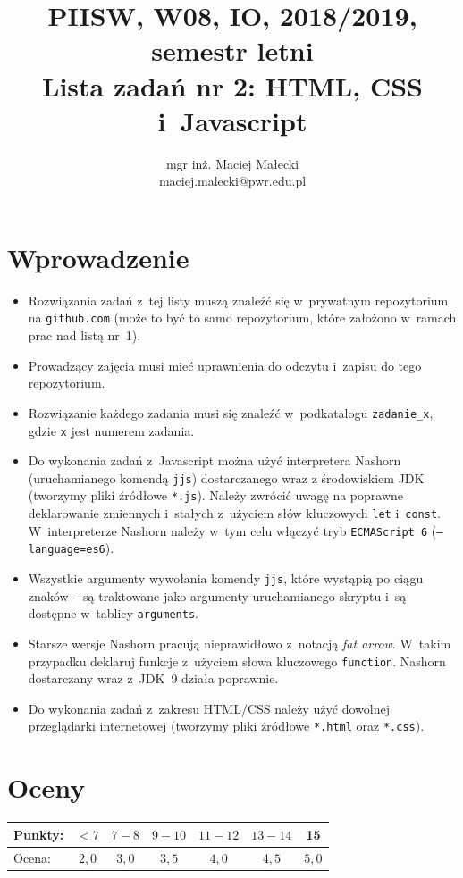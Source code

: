 \documentclass[12pt]{article}
\title{PIISW, W08, IO, 2018/2019, semestr letni\\Lista zadań nr 2: HTML, CSS i~Javascript}
\author{mgr inż. Maciej Małecki\\\small{maciej.malecki@pwr.edu.pl}}
\begin{document}
    \maketitle

    \section*{Wprowadzenie}
    \begin{itemize}
        \item Rozwiązania zadań z~tej listy muszą znaleźć się w~prywatnym repozytorium na \texttt{github.com} (może to być to samo repozytorium, które założono w~ramach prac nad listą nr~1).
        \item Prowadzący zajęcia musi mieć uprawnienia do odczytu i~zapisu do tego repozytorium.
        \item Rozwiązanie każdego zadania musi się znaleźć w~podkatalogu \texttt{zadanie\_x}, gdzie \texttt{x} jest numerem zadania.
        \item Do wykonania zadań z~Javascript można użyć interpretera Nashorn (uruchamianego komendą \texttt{jjs}) dostarczanego wraz z środowiskiem JDK (tworzymy pliki źródłowe \texttt{*.js}). Należy zwrócić uwagę na poprawne deklarowanie zmiennych i~stałych z~użyciem słów kluczowych \texttt{let} i~\texttt{const}. W~interpreterze Nashorn należy w~tym celu włączyć tryb \texttt{ECMAScript~6} (\texttt{--language=es6}).
        \item Wszystkie argumenty wywołania komendy \texttt{jjs}, które wystąpią po ciągu znaków \texttt{--} są traktowane jako argumenty uruchamianego skryptu i~są dostępne w~tablicy \texttt{arguments}.
        \item Starsze wersje Nashorn pracują nieprawidłowo z~notacją \textit{fat arrow}. W~takim przypadku deklaruj funkcje z~użyciem słowa kluczowego \texttt{function}. Nashorn dostarczany wraz z~JDK~9 działa poprawnie.
        \item Do wykonania zadań z~zakresu HTML/CSS należy użyć dowolnej przeglądarki internetowej (tworzymy pliki źródłowe \texttt{*.html} oraz \texttt{*.css}).
    \end{itemize}

    \section*{Oceny}
    \begin{tabular}{|l|c|c|c|c|c|c|}
        \hline
        Punkty: & $<7$ & $7-8$ & $9-10$ & $11-12$ & $13-14$ & 15\\
        \hline
        Ocena:  & $2,0$ & $3,0$ & $3,5$ & $4,0$ & $4,5$ & $5,0$\\
        \hline
    \end{tabular}
\end{document}
